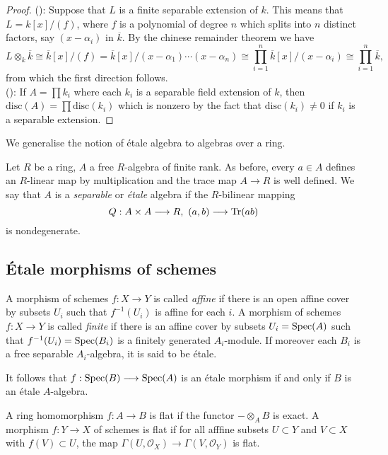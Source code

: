 \begin{proof}
  ():
  Suppose that $L$ is a finite separable extension of $k$. This means that $L = k[x]/(f)$, where $f$ is a polynomial of degree $n$ which splits into $n$ distinct factors, say $(x-\alpha_i)$ in $\overline{k}$. By the chinese remainder theorem we have
  \[L \otimes_k \overline{k} \cong \overline{k}[x]/(f) = \overline{k}[x]/(x-\alpha_1)\cdots(x-\alpha_n) \cong \prod_{i=1}^n \overline{k}[x] / (x-\alpha_i) \cong \prod_{i=1}^n \overline{k},\] from which the first direction follows.\\
  ():
  If $A = \prod k_i$  where each $k_i$ is a separable field extension of $k$, then $\text{disc}(A) = \prod \text{disc}(k_i)$ which is nonzero by the fact that $\text{disc}(k_i) \neq 0$ if $k_i$ is a separable extension.
\end{proof}

We generalise the notion of \'etale algebra to algebras over a ring.

\begin{definition}
  Let $R$ be a ring, $A$ a free $R$-algebra of finite rank. As before, every $a \in A$ defines an $R$-linear map by multiplication and the trace map $A \to R$ is well defined. We say that $A$ is a \textit{separable} or \textit{\'etale} algebra if the $R$-bilinear mapping 
  \[
    Q : A \times A \longrightarrow R,\ (a,b) \longrightarrow \operatorname{Tr}(ab)
  \]
  is nondegenerate.
\end{definition}

\subsection{\'Etale morphisms of schemes}
\begin{definition}
A morphism of schemes $f: X \to Y$ is called \textit{affine} if there is an open affine cover by subsets $U_i$ such that $f^{-1}(U_i)$ is affine for each $i$.  A morphism of schemes $f: X \to Y$ is called \textit{finite} if there is an affine cover by subsets $U_i = \operatorname{Spec}(A)$ such that $f^{-1}(U_i) = \operatorname{Spec}(B_i)$ is a finitely generated $A_i$-module.  If moreover each $B_i$ is a free separable $A_i$-algebra, it is said to be \'etale.
\end{definition}
It follows that $f: \operatorname{Spec}(B) \longrightarrow \operatorname{Spec}(A)$ is an \'etale morphism if and only if $B$ is an \'etale $A$-algebra.

\begin{definition}\label{def:flatness}
  A ring homomorphism $f: A \to B$ is flat if the functor $- \otimes_A B$ is exact. A morphism $f: Y \to X$ of schemes is flat if for all afffine subsets $U \subset Y$ and $V \subset X$ with $f(V) \subset U$, the map $\Gamma(U, \mathcal{O}_X) \to \Gamma(V, \mathcal{O}_Y)$ is flat.
\end{definition}

